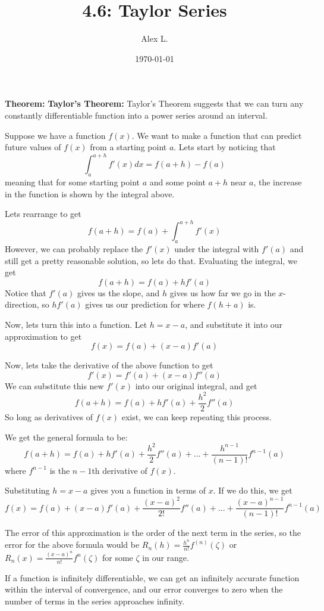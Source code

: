 \documentclass{article}
\title{4.6: Taylor Series}
\author{Alex L.}
\date{\today}
\begin{document}
\maketitle

\textbf{Theorem:} \textbf{Taylor's Theorem:} Taylor's Theorem suggests that we can turn any constantly differentiable function into a power series around an interval. 

Suppose we have a function $f(x)$. We want to make a function that can predict future values of $f(x)$ from a starting point $a$. Lets start by noticing that $$\int_{a}^{a+h} f'(x) dx = f(a+h) - f(a)$$meaning that for some starting point $a$ and some point $a+h$ near $a$, the increase in the function is shown by the integral above.

Lets rearrange to get $$f(a+h) = f(a) + \int_a^{a+h} f'(x)$$However, we can probably replace the $f'(x)$ under the integral with $f'(a)$ and still get a pretty reasonable solution, so lets do that. Evaluating the integral, we get $$f(a+h) = f(a) + hf'(a)$$Notice that $f'(a)$ gives us the slope, and $h$ gives us how far we go in the $x$-direction, so $hf'(a)$ gives us our prediction for where $f(h+a)$ is. 

Now, lets turn this into a function. Let $h = x-a$, and substitute it into our approximation to get $$f(x) = f(a) + (x-a)f'(a)$$

Now, lets take the derivative of the above function to get $$f'(x) = f'(a) + (x-a)f''(a)$$We can substitute this new $f'(x)$ into our original integral, and get $$f(a+h) = f(a) + hf'(a) + \frac{h^2}{2}f''(a)$$So long as derivatives of $f(x)$ exist, we can keep repeating this process. 

We get the general formula to be:$$f(a+h) = f(a) + hf'(a) + \frac{h^2}{2}f''(a) + ... + \frac{h^{n-1}}{(n-1)!}f^{n-1}(a)$$where $f^{n-1}$ is the $n-1$th derivative of $f(x)$. 

Substituting $h = x-a$ gives you a function in terms of $x$. If we do this, we get $$f(x) = f(a) + (x-a)f'(a)+\frac{(x-a)^2}{2!}f''(a) + ... + \frac{(x-a)^{n-1}}{(n-1)!}f^{n-1}(a)$$

The error of this approximation is the order of the next term in the series, so the error for the above formula would be $R_n(h) = \frac{h^n}{n!}f^{(n)}(\zeta)$ or $R_n(x) = \frac{(x-a)^n}{n!}f^{n}(\zeta)$ for some $\zeta$ in our range. 

If a function is infinitely differentiable, we can get an infinitely accurate function within the interval of convergence, and our error converges to zero when the number of terms in the series approaches infinity. 
\end{document}
